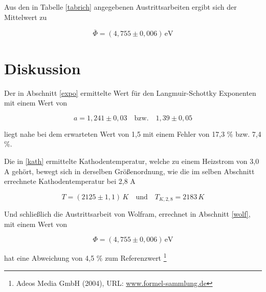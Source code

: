Aus den in Tabelle \ref{tabrich} angegebenen Austrittsarbeiten ergibt sich der Mittelwert zu

\begin{equation}
 \bar \Phi = (4,755 \pm 0,006)\, \text{eV}
\end{equation}

\section{Diskussion}
Der in Abschnitt \ref{expo} ermittelte Wert für den Langmuir-Schottky Exponenten mit einem Wert von 

\begin{equation*}
 a = 1,241 \pm 0,03 \quad \text{bzw.} \quad 1,39 \pm 0,05
\end{equation*}

liegt nahe bei dem erwarteten Wert von 1,5 mit einem Fehler von 17,3 \% bzw. 7,4 \%. 

Die in \ref{kath} ermittelte Kathodentemperatur, welche zu einem Heizstrom von 3,0 A gehört, bewegt sich in derselben Größenordnung,
wie die im selben Abschnitt errechnete Kathodentemperatur bei 2,8 A

\begin{equation*}
 T = (2125 \pm 1,1)\, K \quad \text{und} \quad T_{K,2,8} = 2183 \, K
\end{equation*}

Und schließlich die Austrittsarbeit von Wolfram, errechnet in Abschnitt \ref{wolf}, mit einem Wert von 

\begin{equation*}
 \Phi = (4,755 \pm 0,006) \, \text{eV}
\end{equation*}

hat eine Abweichung von 4,5 \% zum Referenzwert
\footnote[1]{Adeos Media GmbH (2004), URL: \href{http://www.formel-sammlung.de/formel-Austrittsarbeit-von-Elektronen-aus-Metallen-3-25-134.html}{www.formel-sammlung.de}}








